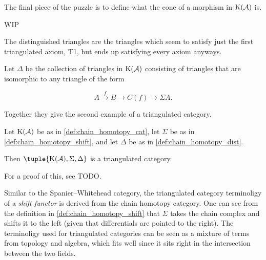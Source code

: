 The final piece of the puzzle is to define what the cone of a morphism in \( \operatorname{K}({\mathcal{A}}) \) is.

\begin{definition}
    WIP
\end{definition}

The distinguished triangles are the triangles which seem to satisfy just the first triangulated axiom, T1, but ends up satisfying every axiom anyways.

\begin{definition}
    \label{def:chain_homotopy_dist}
    Let \( \Delta \) be the collection of triangles in \( \operatorname{K}({\mathcal{A}}) \) consisting of triangles that are isomorphic to any triangle of the form

    \[
        A \stackrel{f}{\to} B \to C(f) \to \Sigma A.
    \]
\end{definition}

Together they give the second example of a triangulated category.

\begin{example}
    Let \( \operatorname{K}({\mathcal{A}}) \) be as in \autoref{def:chain_homotopy_cat}, let \( \Sigma \) be as in \autoref{def:chain_homotopy_shift}, and let \( \Delta \) be as in \autoref{def:chain_homotopy_dist}.

    Then \( \tuple{\K(\Ac), \Sigma, \Delta} \) is a triangulated category.
\end{example}

For a proof of this, see TODO.

Similar to the Spanier--Whitehead category, the triangulated category terminoligy of a \emph{shift functor} is derived from the chain homotopy category. One can see from the definition in \autoref{def:chain_homotopy_shift} that \( \Sigma \) takes the chain complex and shifts it to the left (given that differentials are pointed to the right). The terminoligy used for triangulated categories can be seen as a mixture of terms from topology and algebra, which fits well since it sits right in the intersection between the two fields.
